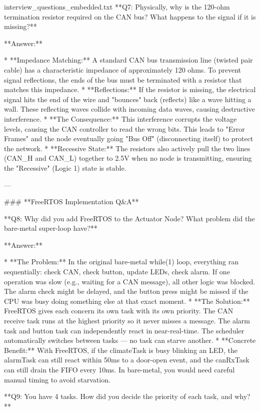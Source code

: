 \begin{filecontents*}{interview_questions_embedded.txt}
**Q7: Physically, why is the 120-ohm termination resistor required on the CAN bus? What happens to the signal if it is missing?**

**Answer:**

* **Impedance Matching:** A standard CAN bus transmission line (twisted pair cable) has a characteristic impedance of approximately 120 ohms. To prevent signal reflections, the ends of the bus must be terminated with a resistor that matches this impedance.
* **Reflections:** If the resistor is missing, the electrical signal hits the end of the wire and "bounces" back (reflects) like a wave hitting a wall. These reflecting waves collide with incoming data waves, causing destructive interference.
* **The Consequence:** This interference corrupts the voltage levels, causing the CAN controller to read the wrong bits. This leads to "Error Frames" and the node eventually going "Bus Off" (disconnecting itself) to protect the network.
* **Recessive State:** The resistors also actively pull the two lines (CAN_H and CAN_L) together to 2.5V when no node is transmitting, ensuring the "Recessive" (Logic 1) state is stable.

---

### **FreeRTOS Implementation Q&A**

**Q8: Why did you add FreeRTOS to the Actuator Node? What problem did the bare-metal super-loop have?**

**Answer:**

* **The Problem:** In the original bare-metal while(1) loop, everything ran sequentially: check CAN, check button, update LEDs, check alarm. If one operation was slow (e.g., waiting for a CAN message), all other logic was blocked. The alarm check might be delayed, and the button press might be missed if the CPU was busy doing something else at that exact moment.
* **The Solution:** FreeRTOS gives each concern its own task with its own priority. The CAN receive task runs at the highest priority so it never misses a message. The alarm task and button task can independently react in near-real-time. The scheduler automatically switches between tasks — no task can starve another.
* **Concrete Benefit:** With FreeRTOS, if the climateTask is busy blinking an LED, the alarmTask can still react within 50ms to a door-open event, and the canRxTask can still drain the FIFO every 10ms. In bare-metal, you would need careful manual timing to avoid starvation.

**Q9: You have 4 tasks. How did you decide the priority of each task, and why?**


\end{filecontents*}
